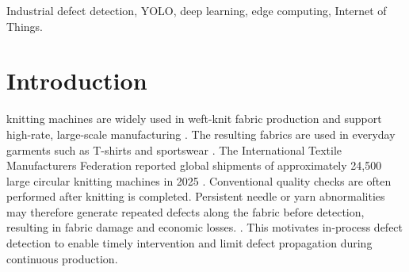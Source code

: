 \documentclass[journal]{IEEEtran}
\newcommand{\model}{DMFR-YOLO\xspace}
\begin{document}
\begin{abstract}
Circular knitting machines are widely used in continuous fabric production. Needle or yarn abnormalities can cause repeated defects along the fabric before they are detected, resulting in material waste and economic losses. To enable in-process defect detection and intervention, we develop a closed-loop defect detection system with edge inference and wired machine-stop control, and propose a lightweight detector termed \model. \model introduces defect morphology encoding (DME) into the backbone to explicitly model horizontally elongated defects, vertically elongated defects, and localized hole-like defects. In the feature pyramid, content-adaptive feature reassembly (CAFR) replaces fixed upsampling with content-adaptive reconstruction, improving the preservation of defect boundaries and weak responses during multi-scale feature fusion. Evaluated on a self-collected fabric defect dataset from a real-world circular knitting machine production line, \model achieves 66.3\% AP and 96.9\% AP50, improving the YOLOv8n baseline by 7.0 and 2.8 percentage points, respectively, with only 3.39 M parameters. The detector is deployed as an INT8 RKNN model on an RK3566 edge device. The resulting system couples real-time defect detection, automatic local stop control, operator review, and cloud-based quality analysis, providing a practical solution for reducing defect propagation during circular-knitting production.
\end{abstract}

\begin{IEEEkeywords}
Industrial defect detection, YOLO, deep learning, edge computing, Internet of Things.
\end{IEEEkeywords}

\section{Introduction}
 knitting machines are widely used in weft-knit fabric production and support high-rate, large-scale manufacturing \cite{cottonworksKnitBasics,woolmarkCircularKnitting}. The resulting fabrics are used in everyday garments such as T-shirts and sportswear \cite{cottonworksSingleDouble,woolmarkCircularKnitting}. The International Textile Manufacturers Federation reported global shipments of approximately 24,500 large circular knitting machines in 2025 \cite{itmf2025press}. Conventional quality checks are often performed after knitting is completed. Persistent needle or yarn abnormalities may therefore generate repeated defects along the fabric before detection, resulting in fabric damage and economic losses. \cite{takeuchi2018knitted,akter2022material,eeaTextiles}. This motivates in-process defect detection to enable timely intervention and limit defect propagation during continuous production.
\end{document}

